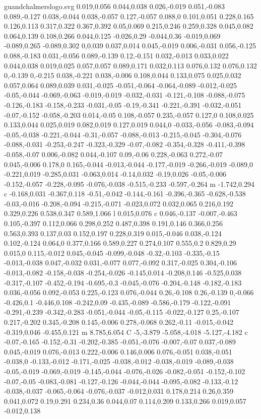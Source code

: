 \begin{filecontents}[noheader]{guandchalmerslogo.svg}
0.019,0.056 0.044,0.038 0.026,-0.019 0.051,-0.083 0.089,-0.127 0.038,-0.044 0.038,-0.057 0.127,-0.057 0.088,0 0.101,0.051 0.228,0.165 0.126,0.113 0.317,0.322 0.367,0.392 0.05,0.069 0.215,0.246 0.259,0.328 0.045,0.082 0.064,0.139 0.108,0.266 0.044,0.125 -0.026,0.29 -0.044,0.36 -0.019,0.069 -0.089,0.265 -0.089,0.302 0,0.039 0.037,0.014 0.045,-0.019 0.006,-0.031 0.056,-0.125 0.088,-0.183 0.031,-0.056 0.089,-0.139 0.12,-0.151 0.032,-0.013 0.033,0.022 0.044,0.038 0.019,0.025 0.057,0.057 0.089,0.171 0.032,0.113 0.076,0.132 0.076,0.132 0,-0.139 0,-0.215 0.038,-0.221 0.038,-0.006 0.108,0.044 0.133,0.075 0.025,0.032 0.057,0.064 0.089,0.039 0.031,-0.025 -0.051,-0.064 -0.064,-0.089 -0.012,-0.025 -0.05,-0.044 -0.069,-0.063 -0.019,-0.019 -0.032,-0.031 -0.121,-0.108 -0.088,-0.075 -0.126,-0.183 -0.158,-0.233 -0.031,-0.05 -0.19,-0.341 -0.221,-0.391 -0.032,-0.051 -0.07,-0.152 -0.058,-0.203 0.014,-0.05 0.108,-0.057 0.235,-0.057 0.127,0 0.108,0.025 0.133,0.044 0.025,0.019 0.082,0.019 0.127,0.019 0.044,0 -0.033,-0.056 -0.083,-0.094 -0.05,-0.038 -0.221,-0.044 -0.31,-0.057 -0.088,-0.013 -0.215,-0.045 -0.304,-0.076 -0.088,-0.031 -0.253,-0.247 -0.323,-0.329 -0.07,-0.082 -0.354,-0.328 -0.411,-0.398 -0.058,-0.07 0.006,-0.082 0.044,-0.107 0.09,-0.06 0.228,-0.063 0.272,-0.07 0.045,-0.006 0.178,0 0.165,-0.044 -0.013,-0.044 -0.177,-0.019 -0.266,-0.019 -0.089,0 -0.221,0.019 -0.285,0.031 -0.063,0.014 -0.14,0.032 -0.19,0.026 -0.05,-0.006 -0.152,-0.057 -0.228,-0.095 -0.076,-0.038 -0.515,-0.233 -0.597,-0.264 m -1.742,0.294 c -0.168,0.031 -0.367,0.118 -0.51,-0.042 -0.144,-0.161 -0.396,-0.365 -0.628,-0.538 -0.03,-0.016 -0.208,-0.094 -0.215,-0.071 -0.023,0.072 0.032,0.065 0.216,0.192 0.329,0.226 0.538,0.347 0.589,1.066 l 0.015,0.076 c 0.046,-0.137 -0.007,-0.463 0.105,-0.397 0.112,0.066 0.298,0.252 0.487,0.398 0.191,0.146 0.366,0.256 0.563,0.393 0.137,0.03 0.152,0.197 0.228,0.319 0.015,-0.046 0.038,-0.124 0.102,-0.124 0.064,0 0.377,0.166 0.589,0.227 0.274,0.107 0.555,0.2 0.829,0.29 0.015,0 0.115,-0.012 0.045,-0.045 -0.099,-0.048 -0.32,-0.103 -0.335,-0.15 -0.013,-0.038 0.047,-0.032 0.031,-0.077 0.077,-0.092 0.317,-0.025 0.304,-0.106 -0.013,-0.082 -0.158,-0.038 -0.254,-0.026 -0.145,0.014 -0.208,0.146 -0.525,0.038 -0.317,-0.107 -0.452,-0.194 -0.695,-0.3 -0.045,-0.076 -0.204,-0.148 -0.182,-0.183 0.036,-0.056 0.092,-0.053 0.225,-0.123 0.076,-0.044 0.26,-0.108 0.26,-0.139 0,-0.066 -0.426,0.1 -0.446,0.108 -0.242,0.09 -0.435,-0.089 -0.586,-0.179 -0.122,-0.091 -0.291,-0.239 -0.342,-0.283 -0.051,-0.044 -0.05,-0.115 -0.022,-0.127 0.25,-0.107 0.217,-0.202 0.345,-0.208 0.145,-0.006 0.278,-0.068 0.262,-0.11 -0.015,-0.042 -0.319,0.046 -0.455,0.121 m 8.785,6.054 C -5,-3.879 -5.058,-4.018 -5.127,-4.182 c -0.07,-0.165 -0.152,-0.31 -0.202,-0.385 -0.051,-0.076 -0.007,-0.07 0.037,-0.089 0.045,-0.019 0.076,-0.013 0.222,-0.006 0.146,0.006 0.076,-0.051 0.038,-0.051 -0.038,0 -0.133,-0.012 -0.171,-0.025 -0.038,-0.012 -0.038,-0.019 -0.089,-0.038 -0.05,-0.019 -0.069,-0.019 -0.145,-0.044 -0.076,-0.026 -0.082,-0.051 -0.152,-0.102 -0.07,-0.05 -0.083,-0.081 -0.127,-0.126 -0.044,-0.044 -0.095,-0.082 -0.133,-0.12 -0.038,-0.037 -0.065,-0.064 -0.076,-0.037 -0.012,0.031 0.178,0.214 0.26,0.359 0.041,0.072 0.19,0.291 0.234,0.36 0.044,0.07 0.114,0.209 0.133,0.266 0.019,0.057 -0.012,0.138 
\end{filecontents}
